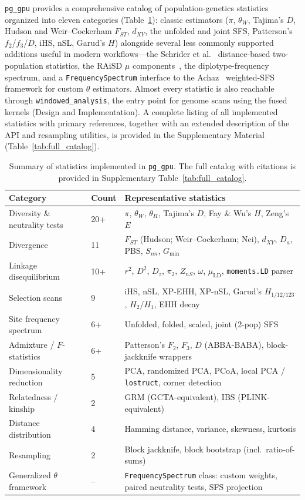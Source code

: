 \documentclass[12pt]{article}
\newcommand{\citep}{\parencite}
\newcommand{\pggpu}{\texttt{pg\_gpu}\xspace}
\newcommand{\lostruct}{\texttt{lostruct}\xspace}
\begin{document}
\pggpu provides a comprehensive catalog of population-genetics
statistics organized into eleven categories
(Table~\ref{tab:features}): classic estimators ($\pi$, $\theta_W$,
Tajima's $D$, Hudson and Weir--Cockerham $F_{ST}$, $d_{XY}$, the
unfolded and joint SFS, Patterson's $f_2$/$f_3$/$D$, iHS, nSL, Garud's
$H$) alongside several less commonly supported additions useful in
modern workflows---the Schrider et al.~\citep{schrider2018}
distance-based two-population statistics, the RAiSD
$\mu$ components~\citep{alachiotis2018}, the diplotype-frequency
spectrum, and a \texttt{FrequencySpectrum} interface to the
Achaz~\citep{achaz2009} weighted-SFS framework for custom $\theta$
estimators. Almost every statistic is also reachable through
\texttt{windowed\_analysis}, the entry point for genome
scans using the fused kernels (Design and Implementation). A complete listing of all
implemented statistics with primary references, together with an
extended description of the API and resampling utilities, is provided
in the Supplementary Material (Table~\ref{tab:full_catalog}).

\begin{table}[ht]
\centering
\small
\caption{Summary of statistics implemented in \pggpu. The full catalog with
citations is provided in Supplementary Table~\ref{tab:full_catalog}.}
\label{tab:features}
\begin{tabular}{llp{5.5cm}}
\toprule
\textbf{Category} & \textbf{Count} & \textbf{Representative statistics} \\
\midrule
Diversity \& neutrality tests & 20+ & $\pi$, $\theta_W$, $\theta_H$, Tajima's $D$, Fay \& Wu's $H$, Zeng's $E$ \\
Divergence & 11 & $F_{ST}$ (Hudson; Weir--Cockerham; Nei), $d_{XY}$, $D_a$, PBS, $S_{nn}$, $G_{\min}$ \\
Linkage disequilibrium & 10+ & $r^2$, $D^2$, $D_z$, $\pi_2$, $Z_{nS}$, $\omega$, $\mu_{\mathrm{LD}}$, \texttt{moments.LD} parser \\
Selection scans & 9 & iHS, nSL, XP-EHH, XP-nSL, Garud's $H_{1/12/123}$, $H_{2}/H_{1}$, EHH decay \\
Site frequency spectrum & 6+ & Unfolded, folded, scaled, joint (2-pop) SFS \\
Admixture / $F$-statistics & 6+ & Patterson's $F_2$, $F_3$, $D$ (ABBA-BABA), block-jackknife wrappers \\
Dimensionality reduction & 5 & PCA, randomized PCA, PCoA, local PCA / \lostruct, corner detection \\
Relatedness / kinship & 2 & GRM (GCTA-equivalent), IBS (PLINK-equivalent) \\
Distance distribution & 4 & Hamming distance, variance, skewness, kurtosis \\
Resampling & 2 & Block jackknife, block bootstrap (incl.\ ratio-of-sums) \\
Generalized $\theta$ framework & -- & \texttt{FrequencySpectrum} class: custom weights, paired neutrality tests, SFS projection \\
\bottomrule
\end{tabular}
\end{table}
\end{document}
